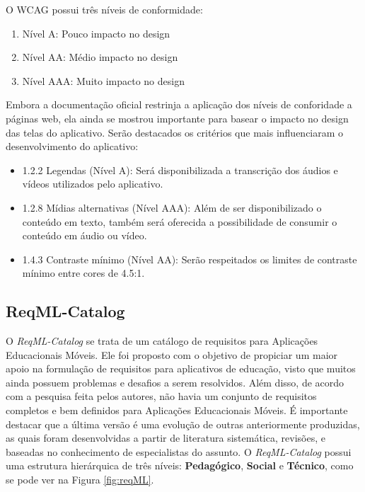 O WCAG possui três níveis de conformidade:
\begin{enumerate}
    \item Nível A: Pouco impacto no design
    \item Nível AA: Médio impacto no design
    \item Nível AAA: Muito impacto no design
\end{enumerate}

Embora a documentação oficial restrinja a aplicação dos níveis de conforidade a páginas web, ela ainda se mostrou importante para basear o impacto no design das telas do aplicativo. 
Serão destacados os critérios que mais influenciaram o desenvolvimento do aplicativo:

\begin{itemize}
    \item 1.2.2 Legendas (Nível A): Será disponibilizada a transcrição dos áudios e vídeos utilizados pelo aplicativo.
    \item 1.2.8 Mídias alternativas (Nível AAA): Além de ser disponibilizado o conteúdo em texto, também será oferecida a possibilidade de consumir o conteúdo em áudio ou vídeo.
    \item 1.4.3 Contraste mínimo (Nível AA): Serão respeitados os limites de contraste mínimo entre cores de 4.5:1.
\end{itemize}


\subsection{ReqML-Catalog}
O \textit{ReqML-Catalog} \citep{soad2017reqml} se trata de um catálogo de requisitos para Aplicações Educacionais Móveis. Ele foi proposto com o objetivo de propiciar um maior apoio na formulação de requisitos para aplicativos de educação, visto que muitos ainda possuem problemas e desafios a serem resolvidos. Além disso, de acordo com a pesquisa feita pelos autores, não havia um conjunto de requisitos completos e bem definidos para Aplicações Educacionais Móveis. É importante destacar que a última versão é uma evolução de outras anteriormente produzidas, as quais foram desenvolvidas a partir de literatura sistemática, revisões, e baseadas no conhecimento de especialistas do assunto. 
O \textit{ReqML-Catalog} possui uma estrutura hierárquica de três níveis: \textbf{Pedagógico}, \textbf{Social} e \textbf{Técnico}, como se pode ver na Figura \ref{fig:reqML}.

